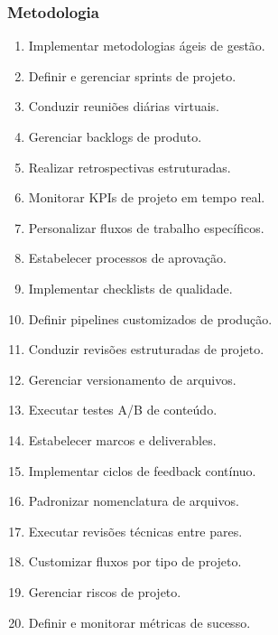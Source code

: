 \subsubsection{Metodologia}
\begin{enumerate}
 \item Implementar metodologias ágeis de gestão.
 \item Definir e gerenciar sprints de projeto.
 \item Conduzir reuniões diárias virtuais.
 \item Gerenciar backlogs de produto.
 \item Realizar retrospectivas estruturadas.
 \item Monitorar KPIs de projeto em tempo real.
 \item Personalizar fluxos de trabalho específicos.
 \item Estabelecer processos de aprovação.
 \item Implementar checklists de qualidade.
 \item Definir pipelines customizados de produção.
 \item Conduzir revisões estruturadas de projeto.
 \item Gerenciar versionamento de arquivos.
 \item Executar testes A/B de conteúdo.
 \item Estabelecer marcos e deliverables.
 \item Implementar ciclos de feedback contínuo.
 \item Padronizar nomenclatura de arquivos.
 \item Executar revisões técnicas entre pares.
 \item Customizar fluxos por tipo de projeto.
 \item Gerenciar riscos de projeto.
 \item Definir e monitorar métricas de sucesso.
\end{enumerate}

